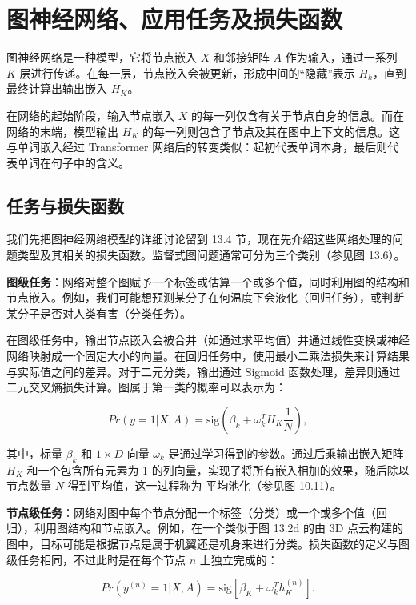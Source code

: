\section{图神经网络、应用任务及损失函数}
图神经网络是一种模型，它将节点嵌入 \(X\) 和邻接矩阵 \(A\) 作为输入，通过一系列 \(K\) 层进行传递。在每一层，节点嵌入会被更新，形成中间的“隐藏”表示 \(H_k\)，直到最终计算出输出嵌入 \(H_K\)。

在网络的起始阶段，输入节点嵌入 \(X\) 的每一列仅含有关于节点自身的信息。而在网络的末端，模型输出 \(H_K\) 的每一列则包含了节点及其在图中上下文的信息。这与单词嵌入经过 Transformer 网络后的转变类似：起初代表单词本身，最后则代表单词在句子中的含义。

\subsection{任务与损失函数}
我们先把图神经网络模型的详细讨论留到 13.4 节，现在先介绍这些网络处理的问题类型及其相关的损失函数。监督式图问题通常可分为三个类别（参见图 13.6）。

\textbf{图级任务}：网络对整个图赋予一个标签或估算一个或多个值，同时利用图的结构和节点嵌入。例如，我们可能想预测某分子在何温度下会液化（回归任务），或判断某分子是否对人类有害（分类任务）。

在图级任务中，输出节点嵌入会被合并（如通过求平均值）并通过线性变换或神经网络映射成一个固定大小的向量。在回归任务中，使用最小二乘法损失来计算结果与实际值之间的差异。对于二元分类，输出通过 Sigmoid 函数处理，差异则通过二元交叉熵损失计算。图属于第一类的概率可以表示为：

\begin{equation}
Pr(y = 1|X, A) = \text{sig}(\beta_k + \omega_k^T H_K \frac{1}{N}), 
\end{equation}

其中，标量 \(\beta_k\) 和 \(1 \times D\) 向量 \(\omega_k\) 是通过学习得到的参数。通过后乘输出嵌入矩阵 \(H_K\) 和一个包含所有元素为 1 的列向量，实现了将所有嵌入相加的效果，随后除以节点数量 \(N\) 得到平均值，这一过程称为 平均池化（参见图 10.11）。

\textbf{节点级任务}：网络对图中每个节点分配一个标签（分类）或一个或多个值（回归），利用图结构和节点嵌入。例如，在一个类似于图 13.2d 的由 3D 点云构建的图中，目标可能是根据节点是属于机翼还是机身来进行分类。损失函数的定义与图级任务相同，不过此时是在每个节点 \(n\) 上独立完成的：

\begin{equation}
Pr(y^{(n)} = 1|X, A) = \text{sig}\left[\beta_K + \omega_k^T h_K^{(n)} \right]. 
\end{equation}

